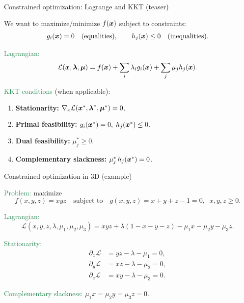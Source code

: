 \documentclass{beamer}
\begin{document}
\begin{frame}{Constrained optimization: Lagrange and KKT (teaser)}

We want to maximize/minimize $f(\boldsymbol x)$ subject to constraints:  
\[
g_i(\boldsymbol x)=0 \quad\text{(equalities)}, 
\qquad
h_j(\boldsymbol x)\le 0 \quad\text{(inequalities)}.
\]

\medskip
\textcolor{SeaGreen}{Lagrangian:}
\[
\mathcal{L}(\boldsymbol x,\boldsymbol \lambda,\boldsymbol \mu)
= f(\boldsymbol x)+\sum_i \lambda_i g_i(\boldsymbol x)+\sum_j \mu_j h_j(\boldsymbol x).
\]

\textcolor{SeaGreen}{KKT conditions} (when applicable):
\begin{enumerate}
\item \textbf{Stationarity: } $\nabla_x \mathcal{L}(\boldsymbol x^*,\boldsymbol \lambda^*,\boldsymbol \mu^*)=0$.
\item \textbf{Primal feasibility: } $g_i(\boldsymbol x^*)=0,\; h_j(\boldsymbol x^*)\le 0$.
\item \textbf{Dual feasibility: } $\mu_j^*\ge 0$.
\item \textbf{Complementary slackness: } $\mu_j^*\,h_j(\boldsymbol x^*)=0$.
\end{enumerate}


\end{frame}

\begin{frame}{Constrained optimization in 3D (example)}

\textcolor{SeaGreen}{Problem:} maximize
\[
f(x,y,z)=xyz
\quad\text{subject to}\quad
g(x,y,z)=x+y+z-1=0,\;\; x,y,z\ge 0.
\]

\medskip
\textcolor{SeaGreen}{Lagrangian:}
\[
\mathcal{L}(x,y,z,\lambda,\mu_1,\mu_2,\mu_3)
= xyz+\lambda(1-x-y-z)-\mu_1x-\mu_2y-\mu_3z.
\]

\textcolor{SeaGreen}{Stationarity:}
\[
\begin{aligned}
\partial_x \mathcal L &= yz-\lambda-\mu_1=0,\\
\partial_y \mathcal L &= xz-\lambda-\mu_2=0,\\
\partial_z \mathcal L &= xy-\lambda-\mu_3=0.
\end{aligned}
\]

\textcolor{SeaGreen}{Complementary slackness:}  
$\mu_1x=\mu_2y=\mu_3z=0$.

\end{frame}
\end{document}
